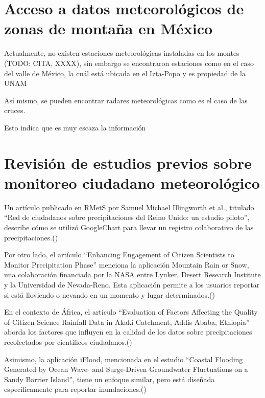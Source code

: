 \newpage
\section{Acceso a datos meteorológicos de zonas de montaña en México}
Actualmente, no existen estaciones meteorológicas instaladas en los montes (TODO: CITA, XXXX), sin embargo se encontraron estaciones como en el caso del valle de México, la cuál está ubicada en el Izta-Popo y es propiedad de la UNAM

Así mismo, se pueden encontrar radares meteorológicas como es el caso de las cruces. 

Esto indica que es muy escaza la información

















\newpage
\section{Revisión de estudios previos sobre monitoreo ciudadano meteorológico}

Un artículo publicado en RMetS por Samuel Michael Illingworth et al., titulado “Red de ciudadanos sobre precipitaciones del Reino Unido: un estudio piloto”, describe cómo se utilizó GoogleChart para llevar un registro colaborativo de las precipitaciones.(\cite{illingworth2021ukprecipitation}) 

Por otro lado, el artículo “Enhancing Engagement of Citizen Scientists to Monitor Precipitation Phase” menciona la aplicación Mountain Rain or Snow, una colaboración financiada por la NASA entre Lynker, Desert Research Institute y la Universidad de Nevada-Reno. Esta aplicación permite a los usuarios reportar si está lloviendo o nevando en un momento y lugar determinados.(\cite{lute2021enhancing})


En el contexto de África, el artículo “Evaluation of Factors Affecting the Quality of Citizen Science Rainfall Data in Akaki Catchment, Addis Ababa, Ethiopia” aborda los factores que influyen en la calidad de los datos sobre precipitaciones recolectados por científicos ciudadanos.(\cite{tedla2022evaluation}) 

Asimismo, la aplicación iFlood, mencionada en el estudio “Coastal Flooding Generated by Ocean Wave- and Surge-Driven Groundwater Fluctuations on a Sandy Barrier Island”, tiene un enfoque similar, pero está diseñada específicamente para reportar inundaciones.(\cite{elgar2021coastal}) 


